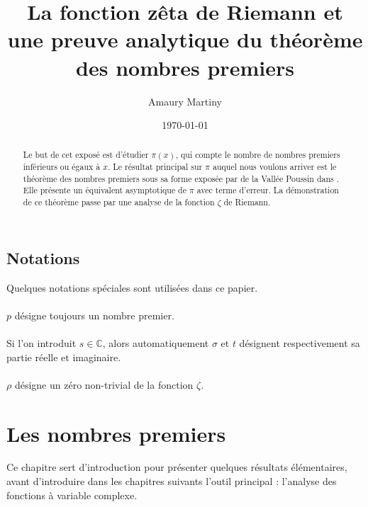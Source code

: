 \documentclass[french]{report}
\title{La fonction zêta de Riemann et une preuve analytique du théorème des nombres premiers}
\author{Amaury Martiny}
\date{\today}
\begin{document}
\maketitle

\begin{abstract}
  Le but de cet exposé est d'étudier $\pi(x)$, qui compte le nombre de nombres premiers inférieurs ou égaux à $x$. Le résultat principal sur $\pi$ auquel nous voulons arriver est le théorème des nombres premiers sous sa forme exposée par de la Vallée Poussin dans \cite{valleepoussin}. Elle présente un équivalent asymptotique de $\pi$ avec terme d'erreur. La démonstration de ce théorème passe par une analyse de la fonction $\zeta$ de Riemann.
\end{abstract}

\tableofcontents{}

\pagebreak
\section*{Notations}
Quelques notations spéciales sont utilisées dans ce papier.
\\\\
$p$ désigne toujours un nombre premier.
\\\\
Si l'on introduit $s\in\mathbb{C}$, alors automatiquement $\sigma$ et $t$ désignent respectivement sa partie réelle et imaginaire.
\\\\
$\rho$ désigne un zéro non-trivial de la fonction $\zeta$.
\chapter{Les nombres premiers}

Ce chapitre sert d'introduction pour présenter quelques résultats élémentaires, avant d'introduire dans les chapitres suivants l'outil principal : l'analyse des fonctions à variable complexe.

\end{document}
